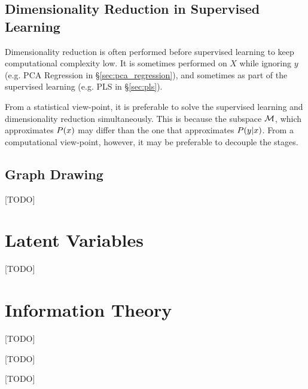 \section{Dimensionality Reduction in Supervised Learning}
Dimensionality reduction is often performed before supervised learning to keep computational complexity low. 
It is sometimes performed on $X$ while ignoring $y$ (e.g. PCA Regression in \S\ref{sec:pca_regression}), and sometimes as part of the supervised learning (e.g. PLS in \S\ref{sec:pls}).

From a statistical view-point, it is preferable to solve the supervised learning and dimensionality reduction simultaneously. This is because the subspace $\mathcal{M}$, which approximates $P(x)$ may differ than the one that approximates $P(y|x)$. 
From a computational view-point, however, it may be preferable to decouple the stages.




\section{Graph Drawing}
[TODO]






\chapter{Latent Variables}
\label{apx:latent}
[TODO]





\chapter{Information Theory}
\label{apx:information_theory}


\begin{definition}[Entropy]
\label{def:entropy}
[TODO]
\end{definition}



\begin{definition}
\label{def:mutual_information}
[TODO]
\end{definition}



\begin{definition}
\label{def:kl_divergence}
[TODO]
\end{definition}





